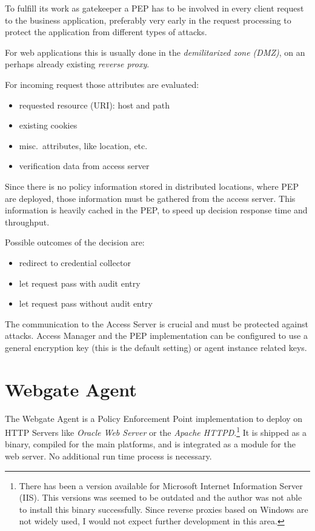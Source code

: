 \documentclass[11pt]{report}
\begin{document}
To fulfill its work as gatekeeper a PEP has to be involved in every
client request to the business application, preferably very early in the
request processing to protect the application from different types of
attacks.

For web applications this is usually done in the \emph{demilitarized zone
(DMZ)}, on an perhaps already existing \emph{reverse proxy}.

For incoming request those attributes are evaluated:

\begin{itemize}
    \item requested resource (URI): host and path
    \item existing cookies
    \item misc.\ attributes, like location, etc.
    \item verification data from access server
\end{itemize}

Since there is no policy information stored in distributed locations,
where PEP are deployed, those information must be gathered from the
access server.  This information is heavily cached in the PEP, to speed
up decision response time and throughput.

Possible outcomes of the decision are:

\begin{itemize}
    \item redirect to credential collector
    \item let request pass with audit entry
    \item let request pass without audit entry
\end{itemize}

The communication to the Access Server is crucial and must be protected
against attacks. Access Manager and the PEP implementation can be
configured to use a general encryption key (this is the default setting)
or agent instance related keys.


\section{Webgate Agent}

The Webgate Agent is a Policy Enforcement Point implementation to deploy
on HTTP Servers like \emph{Oracle Web Server} or the \emph{Apache
HTTPD}.\footnote{There has been a version available for Microsoft
    Internet Information Server (IIS). This versions was seemed to be outdated
    and the author was not able to install this binary successfully.
    Since reverse proxies based on Windows are not widely used, I would
not expect further development in this area.} It is shipped as a binary,
compiled for the main platforms, and is integrated as a module for the
web server. No additional run time process is necessary.
\end{document}
